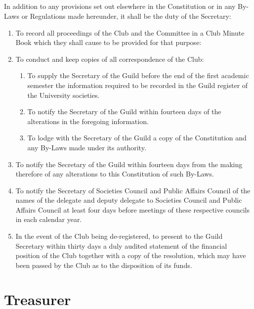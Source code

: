 \documentclass[10.5pt]{article}
\begin{document}
\subsection{} In addition to any provisions set out elsewhere in the Constitution or in any By-Laws or Regulations made hereunder, it shall be the duty of the Secretary: 
\begin{enumerate}[label=(\alph*)]
    \item To record all proceedings of the Club and the Committee in a Club Minute Book which they shall cause to be provided for that purpose: 
    \item To conduct and keep copies of all correspondence of the Club:
    
    \begin{enumerate}[label=(\roman*)]
        \item To supply the Secretary of the Guild before the end of the first academic semester the information required to be recorded in the Guild register of the University societies. 
        \item To notify the Secretary of the Guild within fourteen days of the alterations in the foregoing information. 
        \item To lodge with the Secretary of the Guild a copy of the Constitution and any By-Laws made under its authority. 
    \end{enumerate}
    
\item To notify the Secretary of the Guild within fourteen days from the making therefore of any alterations to this Constitution of such By-Laws. 
\item To notify the Secretary of Societies Council and Public Affairs Council of the names of the delegate and deputy delegate to Societies Council and Public Affairs Council at least four days before meetings of these respective councils in each calendar year. 
\item In the event of the Club being de-registered, to present to the Guild Secretary within thirty days a duly audited statement of the financial position of the Club together with a copy of the resolution, which may have been passed by the Club as to the disposition of its funds. 
\newline
\end{enumerate}


\section{Treasurer} 
\end{document}
